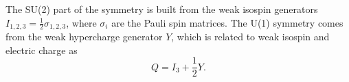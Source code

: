 
The SU(2) part of the symmetry is built from the weak
isospin generators $I_{1,2,3} = \frac{1}{2}\sigma_{1,2,3}$,
where $\sigma_i$ are the Pauli spin matrices. The U(1)
symmetry comes from the weak hypercharge generator $Y$, which
is related to weak isospin and electric charge as
\begin{equation}\label{eqn:hypercharge}
Q = I_3 + \frac{1}{2}Y.
\end{equation}

